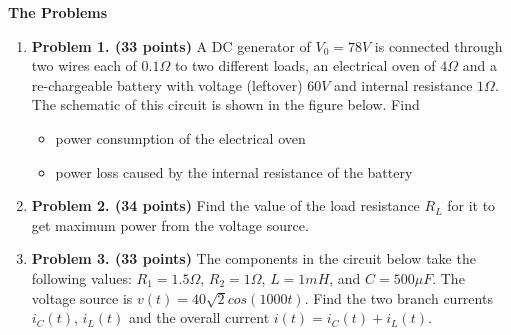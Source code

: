 {\bf The Problems}
\begin{enumerate}

\item {\bf Problem 1. (33 points)} 
A DC generator of $V_0=78V$ is connected through two wires each of 
$0.1\Omega$ to two different loads, an electrical oven of $4\Omega$ 
and a re-chargeable battery with voltage (leftover) $60V$ and internal 
resistance $1\Omega$. The schematic of this circuit is shown in the 
figure below. Find
\begin{itemize}
	\item power consumption of the electrical oven
	\item power loss caused by the internal resistance of the battery
\end{itemize}



\item {\bf Problem 2. (34 points)} 
Find the value of the load resistance $R_L$ for it to get maximum power 
from the voltage source.



\item {\bf Problem 3. (33 points)} 
The components in the circuit below take the following values:
$R_1=1.5\Omega$, $R_2=1\Omega$, $L=1mH$, and $C=500\mu F$. The voltage
source is $v(t)=40\sqrt{2} cos(1000t)$. Find the two branch currents 
$i_C(t)$, $i_L(t)$ and the overall current $i(t)=i_C(t)+i_L(t)$.


\end{enumerate}
